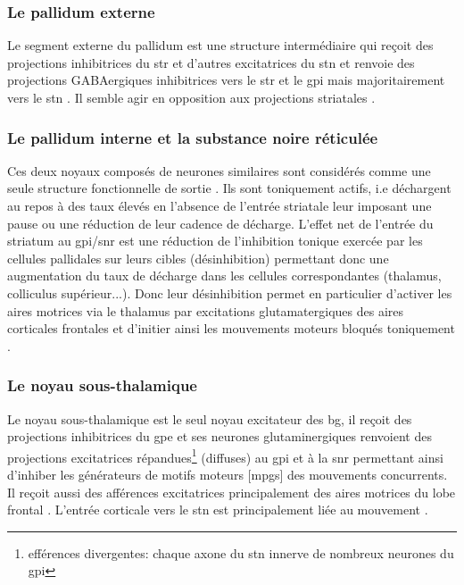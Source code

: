 \subsubsection{Le pallidum externe}

Le segment externe du pallidum est une structure intermédiaire qui reçoit des projections inhibitrices du \gls{str} et d'autres excitatrices du \gls{stn} et renvoie des projections GABAergiques inhibitrices vers le \gls{str} et le \gls{gpi} mais majoritairement vers le \gls{stn} \cite{Rouzaire:1980}. Il semble agir en opposition aux projections striatales \cite{Alexander:1990}.\\


\subsubsection{Le pallidum interne et la substance noire réticulée}

Ces deux noyaux composés de neurones similaires sont considérés comme une seule structure fonctionnelle de sortie \cite {Carpenter:1981}. Ils sont toniquement actifs, i.e déchargent au repos à des taux élevés en l'absence de l'entrée striatale leur imposant une pause ou une réduction de leur cadence de décharge. L'effet net de l'entrée du striatum au \gls{gpi}/\gls{snr} est une réduction de l'inhibition tonique exercée par les cellules pallidales sur leurs cibles (désinhibition) permettant donc une augmentation du taux de décharge dans les cellules correspondantes (thalamus, colliculus supérieur...). Donc leur désinhibition permet en particulier d'activer les aires motrices via le thalamus par excitations glutamatergiques des aires corticales frontales et d'initier ainsi les mouvements moteurs bloqués toniquement \cite{Nauta:1966}.\\


\subsubsection{Le noyau sous-thalamique}

Le noyau sous-thalamique est le seul noyau excitateur des \gls{bg}, il re\c coit des projections inhibitrices du \gls{gpe} et ses neurones glutaminergiques renvoient des projections excitatrices répandues\footnote{efférences divergentes: chaque axone du \gls{stn} innerve de nombreux neurones du \gls{gpi}} (diffuses) au \gls{gpi} et à la \gls{snr} \cite{Parent:1993} permettant ainsi d'inhiber les générateurs de motifs moteurs [\glspl{mpg}] des mouvements concurrents. Il reçoit aussi des afférences excitatrices principalement des aires motrices du lobe frontal \cite{Monakow:1978,Kitai:1981,Nambu:1996,Nambu:1997}. L'entrée corticale vers le \gls{stn} est principalement liée au mouvement \cite{Delong:1985,Wichmann:1994}.\\

